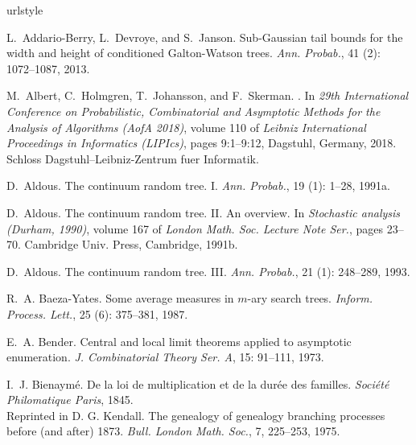 \documentclass[11pt]{article}
\numberwithin{theorem}{section}
\theoremstyle{definition}
\numberwithin{equation}{section}
\begin{document}
\begin{thebibliography}{55}
\providecommand{\natexlab}[1]{#1}
\providecommand{\url}[1]{\texttt{#1}}
\expandafter\ifx\csname urlstyle\endcsname\relax
  \providecommand{\doi}[1]{doi: #1}\else
  \providecommand{\doi}{doi: \begingroup \urlstyle{rm}\Url}\fi

L.~Addario-Berry, L.~Devroye, and S.~Janson.
\newblock Sub-{G}aussian tail bounds for the width and height of conditioned
  {G}alton-{W}atson trees.
\newblock \emph{Ann. Probab.}, 41 (2): 1072--1087, 2013.

M.~Albert, C.~Holmgren, T.~Johansson, and F.~Skerman.
.
\newblock In \emph{29th International Conference on Probabilistic,
  Combinatorial and Asymptotic Methods for the Analysis of Algorithms (AofA
  2018)}, volume 110 of \emph{Leibniz International Proceedings in Informatics
  (LIPIcs)}, pages 9:1--9:12, Dagstuhl, Germany, 2018. Schloss
  Dagstuhl--Leibniz-Zentrum fuer Informatik.

\bibitem[Aldous(1991{\natexlab{a}})]{MR1085326}
D.~Aldous.
\newblock The continuum random tree. {I}.
\newblock \emph{Ann. Probab.}, 19 (1): 1--28,
  1991{\natexlab{a}}.

\bibitem[Aldous(1991{\natexlab{b}})]{a91}
D.~Aldous.
\newblock The continuum random tree. {II}. {A}n overview.
\newblock In \emph{Stochastic analysis ({D}urham, 1990)}, volume 167 of
  \emph{London Math. Soc. Lecture Note Ser.}, pages 23--70. Cambridge Univ.
  Press, Cambridge, 1991{\natexlab{b}}.

D.~Aldous.
\newblock The continuum random tree. {III}.
\newblock \emph{Ann. Probab.}, 21 (1): 248--289, 1993.

R.~A. Baeza-Yates.
\newblock Some average measures in {$m$}-ary search trees.
\newblock \emph{Inform. Process. Lett.}, 25 (6): 375--381,
  1987.

E.~A. Bender.
\newblock Central and local limit theorems applied to asymptotic enumeration.
\newblock \emph{J. Combinatorial Theory Ser. A}, 15: 91--111, 1973.

I.~J. Bienaym\'{e}.
\newblock De la loi de multiplication et de la dur\'{e}e des familles.
\newblock \emph{Soci\'{e}t\'{e} Philomatique Paris}, 1845.
\newblock \\Reprinted in D. G. Kendall. The genealogy of genealogy branching
  processes before (and after) 1873. \emph{Bull. London Math. Soc.}, 7,
  225--253, 1975.



\end{thebibliography}
\end{document}
